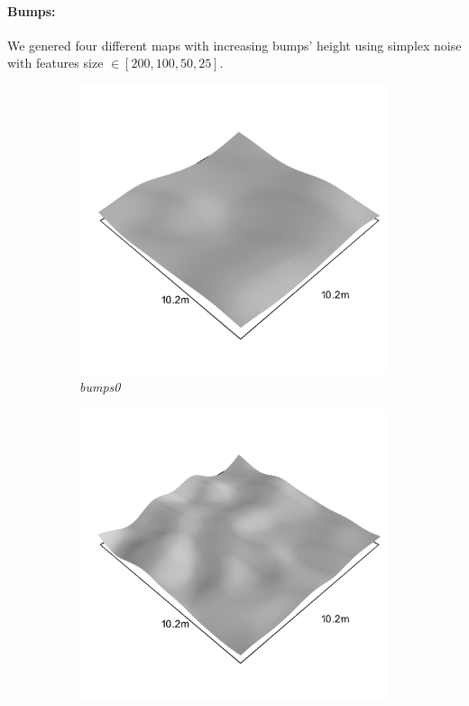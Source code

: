 \documentclass[../document.tex]{subfiles}
\begin{document}
\paragraph{Bumps:} 
We genered four different maps with increasing bumps' height using simplex noise with features size $\in[200,100,50,25 ]$. 
\begin{figure}[H]
    \centering
        \begin{subfigure}[b]{0.32\textwidth}
            \includegraphics[width=\textwidth]{../img/hm3d_borders/bumps0.png}
            \caption{\emph{bumps0}}
        \end{subfigure}
        \begin{subfigure}[b]{0.32\linewidth}
            \includegraphics[width=\textwidth]{../img/hm3d_borders/bumps1.png}

\end{subfigure}
\end{figure}
\end{document}
